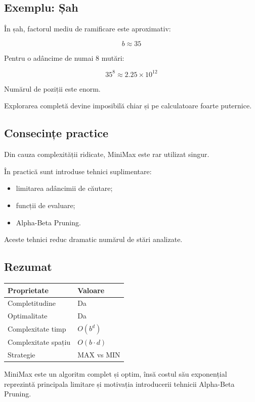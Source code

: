 \documentclass[12pt,a4paper]{article}
\begin{document}
\subsection{Exemplu: Șah}

În șah, factorul mediu de ramificare este aproximativ:

\[
b \approx 35
\]

Pentru o adâncime de numai 8 mutări:

\[
35^8 \approx 2.25 \times 10^{12}
\]

Numărul de poziții este enorm.

Explorarea completă devine imposibilă chiar și pe calculatoare foarte puternice.

\subsection{Consecințe practice}

Din cauza complexității ridicate, MiniMax este rar utilizat singur.

În practică sunt introduse tehnici suplimentare:

\begin{itemize}
\item limitarea adâncimii de căutare;
\item funcții de evaluare;
\item Alpha-Beta Pruning.
\end{itemize}

Aceste tehnici reduc dramatic numărul de stări analizate.

\subsection{Rezumat}

\begin{center}
\begin{tabular}{|l|l|}
\hline
Proprietate & Valoare \\
\hline
Completitudine & Da \\
\hline
Optimalitate & Da \\
\hline
Complexitate timp & $O(b^d)$ \\
\hline
Complexitate spațiu & $O(b \cdot d)$ \\
\hline
Strategie & MAX vs MIN \\
\hline
\end{tabular}
\end{center}

MiniMax este un algoritm complet și optim, însă costul său exponențial reprezintă principala limitare și motivația introducerii tehnicii Alpha-Beta Pruning.







\enddocument{}
\end{document}
